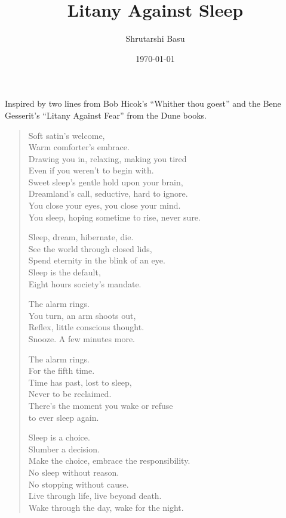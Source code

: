 \documentclass[11pt,letterpaper]{article}
\title{Litany Against Sleep}
\author{Shrutarshi Basu}
\date{\today}
\begin{document}
\maketitle

\begin{center}
\begin{boxedminipage}{0.55\textwidth}
Inspired by two lines from Bob Hicok's ``Whither thou goest'' and the Bene Gesserit's ``Litany Against Fear'' from the Dune books.
\end{boxedminipage}
\end{center}

\begin{verse}

Soft satin's welcome,\\
Warm comforter's embrace.\\
Drawing you in, relaxing, making you tired\\
Even if you weren't to begin with.\\
Sweet sleep's gentle hold upon your brain,\\
Dreamland's call, seductive, hard to ignore.\\
You close your eyes, you close your mind.\\
You sleep, hoping sometime to rise, never sure.

Sleep, dream, hibernate, die.\\
See the world through closed lids,\\
Spend eternity in the blink of an eye.\\
Sleep is the default,\\
Eight hours society's mandate.

The alarm rings.\\
You turn, an arm shoots out,\\
Reflex, little conscious thought.\\
Snooze. A few minutes more.

The alarm rings.\\
For the fifth time.\\
Time has past, lost to sleep,\\
Never to be reclaimed.\\
There's the moment you wake or refuse\\
to ever sleep again.

Sleep is a choice.\\
Slumber a decision.\\
Make the choice, embrace the responsibility.\\
No sleep without reason.\\
No stopping without cause.\\
Live through life, live beyond death.\\
Wake through the day, wake for the night.


\end{verse}
\end{document}
